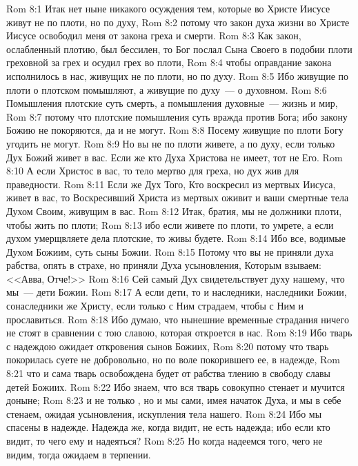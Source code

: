\vs Rom 8:1 Итак нет ныне никакого осуждения тем, которые во Христе Иисусе живут не по плоти, но по духу,
\vs Rom 8:2 потому что закон духа жизни во Христе Иисусе освободил меня от закона греха и смерти.
\vs Rom 8:3 Как закон, ослабленный плотию, был бессилен, то Бог послал Сына Своего в подобии плоти греховной  за грех и осудил грех во плоти,
\vs Rom 8:4 чтобы оправдание закона исполнилось в нас, живущих не по плоти, но по духу.
\vs Rom 8:5 Ибо живущие по плоти о плотском помышляют, а живущие по духу~--- о духовном.
\vs Rom 8:6 Помышления плотские суть смерть, а помышления духовные~--- жизнь и мир,
\vs Rom 8:7 потому что плотские помышления суть вражда против Бога; ибо закону Божию не покоряются, да и не могут.
\vs Rom 8:8 Посему живущие по плоти Богу угодить не могут.
\vs Rom 8:9 Но вы не по плоти живете, а по духу, если только Дух Божий живет в вас. Если же кто Духа Христова не имеет, тот  не Его.
\vs Rom 8:10 А если Христос в вас, то тело мертво для греха, но дух жив для праведности.
\vs Rom 8:11 Если же Дух Того, Кто воскресил из мертвых Иисуса, живет в вас, то Воскресивший Христа из мертвых оживит и ваши смертные тела Духом Своим, живущим в вас.
\rsbpar\vs Rom 8:12 Итак, братия, мы не должники плоти, чтобы жить по плоти;
\vs Rom 8:13 ибо если живете по плоти, то умрете, а если духом умерщвляете дела плотские, то живы будете.
\vs Rom 8:14 Ибо все, водимые Духом Божиим, суть сыны Божии.
\vs Rom 8:15 Потому что вы не приняли духа рабства,  опять  в страхе, но приняли Духа усыновления, Которым взываем: <<Авва, Отче!>>
\vs Rom 8:16 Сей самый Дух свидетельствует духу нашему, что мы~--- дети Божии.
\vs Rom 8:17 А если дети, то и наследники, наследники Божии, сонаследники же Христу, если только с Ним страдаем, чтобы с Ним и прославиться.
\rsbpar\vs Rom 8:18 Ибо думаю, что нынешние временные страдания ничего не стоят в сравнении с тою славою, которая откроется в нас.
\vs Rom 8:19 Ибо тварь с надеждою ожидает откровения сынов Божиих,
\vs Rom 8:20 потому что тварь покорилась суете не добровольно, но по воле покорившего ее, в надежде,
\vs Rom 8:21 что и сама тварь освобождена будет от рабства тлению в свободу славы детей Божиих.
\vs Rom 8:22 Ибо знаем, что вся тварь совокупно стенает и мучится доныне;
\vs Rom 8:23 и не только , но и мы сами, имея начаток Духа, и мы в себе стенаем, ожидая усыновления, искупления тела нашего.
\vs Rom 8:24 Ибо мы спасены в надежде. Надежда же, когда видит, не есть надежда; ибо если кто видит, то чего ему и надеяться?
\vs Rom 8:25 Но когда надеемся того, чего не видим, тогда ожидаем в терпении.
